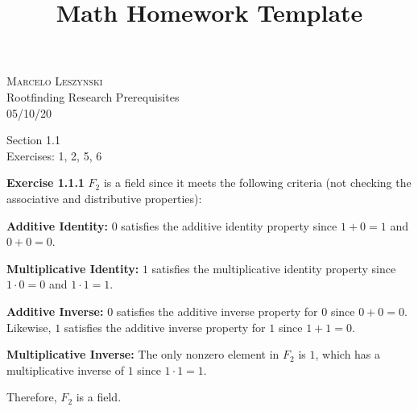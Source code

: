 \documentclass[12pt,oneside]{article}
\newenvironment{exercise}[1]{\vspace{.1in}\noindent\textbf{Exercise #1 \hspace{.05em}}}{}
\begin{document}
\title{Math Homework Template}

\begin{flushright}
\textsc{Marcelo Leszynski}  \\
Rootfinding Research Prerequisites \\
05/10/20
\end{flushright}

\begin{center}
\textsf{Section 1.1 } \\
\textsf{Exercises: 1, 2, 5, 6}
\end{center}


\begin{exercise}{1.1.1}
    $F_2$ is a field since it meets the following criteria (not checking the 
    associative and distributive properties):

    \bigskip
    \textbf{Additive Identity:} $0$ satisfies the additive identity property since 
    $1 + 0 = 1$ and $0 + 0=0$.

    \bigskip
    \textbf{Multiplicative Identity:} $1$ satisfies the multiplicative identity property 
    since $1 \cdot 0 = 0$ and $1 \cdot 1 = 1$.

    \bigskip
    \textbf{Additive Inverse:} $0$ satisfies the additive inverse property for $0$ since 
    $0 + 0 = 0$. Likewise, $1$ satisfies the additive inverse property for $1$ 
    since $1 + 1 = 0$.

    \bigskip
    \textbf{Multiplicative Inverse:} The only nonzero element in $F_2$ is $1$, which has 
    a multiplicative inverse of $1$ since $1 \cdot 1 = 1$. 

    \bigskip
    Therefore, $F_2$ is a field.
\end{exercise}
\end{document}
